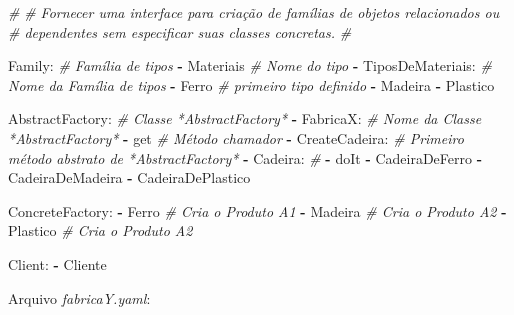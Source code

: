 \documentclass[]{article}
\newenvironment{Shaded}{}{}
\newcommand{\KeywordTok}[1]{\textcolor[rgb]{0.00,0.44,0.13}{\textbf{{#1}}}}
\newcommand{\CommentTok}[1]{\textcolor[rgb]{0.38,0.63,0.69}{\textit{{#1}}}}
\newcommand{\FunctionTok}[1]{\textcolor[rgb]{0.02,0.16,0.49}{{#1}}}
\newcommand{\NormalTok}[1]{{#1}}
\begin{document}
\begin{Shaded}
\begin{Highlighting}[]
\CommentTok{#}
\CommentTok{# Fornecer uma interface para criação de famílias de objetos relacionados ou}
\CommentTok{# dependentes sem especificar suas classes concretas.}
\CommentTok{#}

\FunctionTok{Family:}                     \CommentTok{# Família de tipos}
\KeywordTok{-} \NormalTok{Materiais                 }\CommentTok{# Nome do tipo}
\KeywordTok{-} \FunctionTok{TiposDeMateriais:}         \CommentTok{# Nome da Família de tipos}
    \KeywordTok{-} \NormalTok{Ferro                 }\CommentTok{# primeiro tipo definido}
    \KeywordTok{-} \NormalTok{Madeira}
    \KeywordTok{-} \NormalTok{Plastico}

\FunctionTok{AbstractFactory:}            \CommentTok{# Classe *AbstractFactory*}
\KeywordTok{-} \FunctionTok{FabricaX:}                 \CommentTok{# Nome da Classe *AbstractFactory*}
    \KeywordTok{-} \NormalTok{get                   }\CommentTok{# Método chamador}
    \KeywordTok{-} \FunctionTok{CreateCadeira:}        \CommentTok{# Primeiro método abstrato de *AbstractFactory*}
        \KeywordTok{-} \FunctionTok{Cadeira:}          \CommentTok{# }
            \KeywordTok{-} \NormalTok{doIt}
            \KeywordTok{-} \NormalTok{CadeiraDeFerro}
            \KeywordTok{-} \NormalTok{CadeiraDeMadeira}
            \KeywordTok{-} \NormalTok{CadeiraDePlastico}

\FunctionTok{ConcreteFactory:}
\KeywordTok{-} \NormalTok{Ferro      }\CommentTok{# Cria o Produto A1}
\KeywordTok{-} \NormalTok{Madeira    }\CommentTok{# Cria o Produto A2}
\KeywordTok{-} \NormalTok{Plastico   }\CommentTok{# Cria o Produto A2}

\FunctionTok{Client:}
\KeywordTok{-} \NormalTok{Cliente}
\end{Highlighting}
\end{Shaded}

\clearpage
Arquivo \emph{fabricaY.yaml}:
\end{document}
